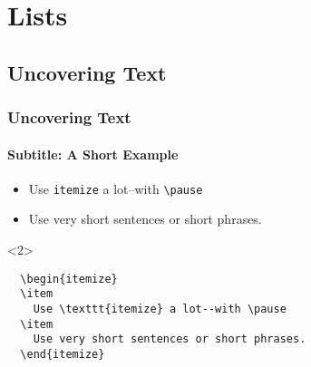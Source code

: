 \section{Lists}

\subsection{Uncovering Text}
\begin{frame}[fragile]
  \frametitle{Uncovering Text}
  \framesubtitle{Subtitle: A Short Example}

  \begin{itemize}
  \item
    Use \texttt{itemize} a lot--with \verb+\pause+\pause
  \item
    Use very short sentences or short phrases.
  \end{itemize}

  \begin{uncoverenv}<2>
  \begin{verbatim}
  \begin{itemize}
  \item
    Use \texttt{itemize} a lot--with \pause
  \item
    Use very short sentences or short phrases.
  \end{itemize}
  \end{verbatim}
  \end{uncoverenv}
\end{frame}

